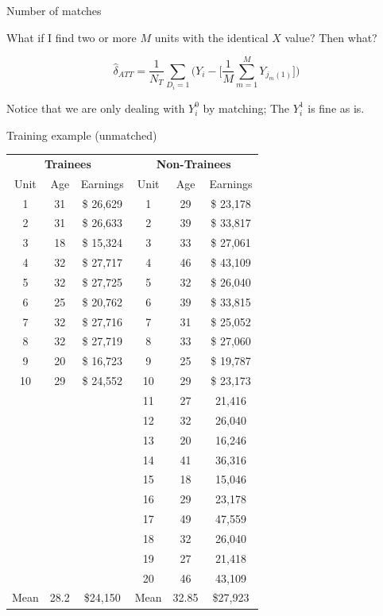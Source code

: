 \documentclass{beamer}
\begin{document}
\begin{frame}{Number of matches}

What if I find two or more $M$ units with the identical $X$ value? Then what?

\begin{equation}
\widehat{\delta}_{ATT} = \dfrac{1}{N_T} \sum_{D_i=1} \bigg ( Y_i - \bigg [\dfrac{1}{M} \sum_{m=1}^M Y_{j_m(1)} \bigg ] \bigg )
\label{eq:att_match}
\end{equation}

\bigskip

Notice that we are only dealing with $Y^0_i$ by matching; The $Y^1_i$ is fine as is.

\end{frame}

\begin{frame}{Training example (unmatched)}

{\renewcommand{\arraystretch}{1.1}
\tabcolsep
\begin{table}[htb]\tiny{}
\centering
\begin{tabular}{ccc|ccc}
\toprule
	\multicolumn{3}{c}{\textbf{Trainees}}&
	\multicolumn{3}{c}{\textbf{Non-Trainees}}\\
	\multicolumn{1}{c}{Unit}&
	\multicolumn{1}{c}{Age}&
	\multicolumn{1}{c}{Earnings}&
	\multicolumn{1}{c}{Unit}&
	\multicolumn{1}{c}{Age}&
	\multicolumn{1}{c}{Earnings}\\
\midrule
1 & 	31 & \$	26,629 & 	1 & 	29 & \$	23,178 \\
2 & 	31 & \$	26,633 & 	2 & 	39 &\$ 	33,817 \\
3 & 	18 & 	\$	15,324 & 	3 & 	33 & \$	27,061 \\
4 & 	32 &\$ 	27,717 & 	4 & 	46 & \$	43,109 \\
5 & 	32 & \$	27,725 & 	5 & 	32 & \$	26,040 \\
6 & 	25 & \$	20,762 & 	6 & 	39 & \$	33,815 \\
7 & 	32 &\$ 	27,716 & 	7 & 	31 & \$	25,052 \\
8 & 	32 & \$	27,719 & 	8 & 	33 & \$	27,060 \\
9 & 	20 & \$	16,723 & 	9 & 	25 &\$ 	19,787 \\
10 & 	29 & \$	24,552 & 	10 & 	29 &\$ 	23,173 \\
&&&			11 & 	27 & 	21,416 \\
&&&			12 & 	32 & 	26,040 \\
&&&			13 & 	20 & 	16,246 \\
&&&			14 & 	41 & 	36,316 \\
&&&			15 & 	18 & 	15,046 \\
&&&			16 & 	29 & 	23,178 \\
&&&			17 & 	49 & 	47,559 \\
&&&			18 & 	32 & 	26,040 \\
&&&			19 & 	27 & 	21,418 \\
&&&			20 & 	46 & 	43,109 \\
\midrule
Mean & 	28.2 & 	\$24,150 & 	Mean & 	32.85 & 	\$27,923 \\
\bottomrule
\end{tabular}
\label{tab:trainee1}
\end{table}
}


\end{frame}
\end{document}
